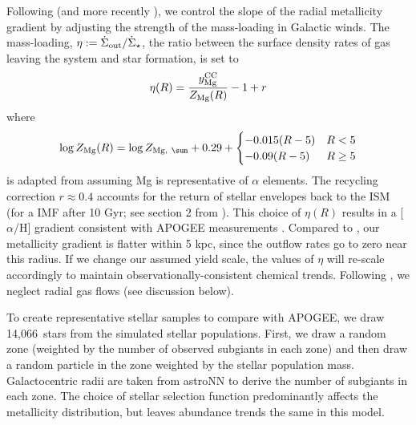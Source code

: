 \documentclass[fleqn,
usenatbib]{mnras}
\newcommand{\JJ}{\citetalias{james+21}}
\newcommand{\nsubgiants}{14,066}
\begin{document}
Following \JJ{} (and more recently \citealt{james+24}), we control the slope of the radial metallicity gradient by adjusting the strength of the mass-loading in Galactic winds. The mass-loading, $\eta :=  \dot\Sigma_{\rm out} / \dot \Sigma_\star$, the ratio between the surface density rates of gas leaving the system and star formation, is set to
\begin{equation}\label{eq:mass_loading}
\eta(R) = \frac{y_{\rm Mg}^{\rm CC}}{Z_{\rm Mg}(R)} -1 + r %
\end{equation}
where 
\begin{equation}
    \log Z_{\rm Mg}(R) = \log Z_{\rm Mg,\ \sun} + 
    0.29 + 
    \begin{cases}
        -0.015(R-5) & R < 5 \\
        -0.09(R-5) & R \geq 5
    \end{cases}
\end{equation}
is adapted from \citet{hayden+14} assuming Mg is representative of $\alpha$ elements.
The recycling correction $r\approx 0.4$ accounts for the return of stellar envelopes back to the ISM (for a \citealt{kroupa01} IMF after 10 Gyr; see section 2 from \citealt{WAF17}).
This choice of $\eta(R)$ results in a [$\alpha$/H] gradient consistent with APOGEE measurements \citep[e.g.,][]{frinchaboy+13, hayden+14, weinberg+19}.
Compared to \citet{james+21, james+24}, our metallicity gradient is flatter within 5 kpc, since the outflow rates go to zero near this radius.
If we change our assumed yield scale, the values of $\eta$ will re-scale accordingly to maintain observationally-consistent chemical trends. Following \JJ, we neglect radial gas flows (see discussion below). 

To create representative stellar samples to compare with APOGEE, 
we draw \nsubgiants\ stars from the simulated stellar populations. First, we draw a random zone (weighted by the number of observed subgiants in each zone) and then draw a random particle in the zone weighted by the stellar population mass.
Galactocentric radii are taken from astroNN \citep{leung+bovy19, leung+bovy19b} to derive the number of subgiants in each zone.  The choice of stellar selection function predominantly affects the metallicity distribution, but leaves abundance trends the same in this model.
\end{document}
